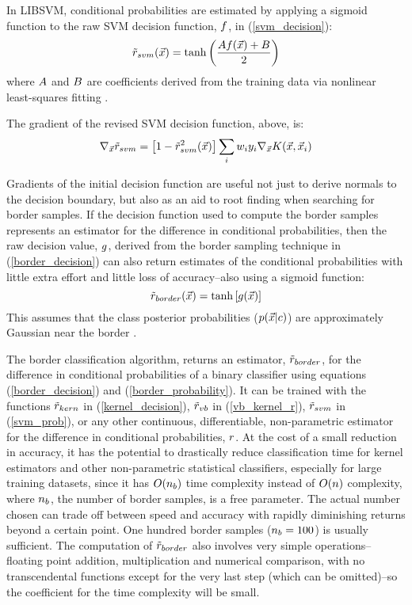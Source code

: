 \documentclass[11pt]{article}
\begin{document}
In LIBSVM, conditional probabilities are estimated by applying a
sigmoid function to
the raw SVM decision function, $f$, in (\ref{svm_decision}):
\begin{equation}
	\tilde r_{svm}(\vec {x}) = \tanh \left (\frac{A f(\vec {x})+ B}{2} \right )
	\label{svm_prob}
\end{equation}
where $A$ and $B$ are coefficients derived from
the training data via
nonlinear least-squares fitting \citep{Lin_etal2007, Chang_Lin2011}.

The gradient of the revised SVM decision function, above, is:
\begin{equation}
	\nabla_{\vec {x}} {\tilde r_{svm}} = \left [1 - \tilde r_{svm}^2(\vec {x}) \right ] \sum_i w_i y_i \nabla_{\vec {x}} K(\vec {x}, \vec {x}_i)
\end{equation}

Gradients of the initial decision function are useful not just to derive normals to
the decision boundary, but also as an aid to root finding when searching for
border samples. If the decision function used to compute the border samples
represents an estimator for the
difference in conditional probabilities, then the raw decision value,
$g$,
derived from the border sampling technique in (\ref{border_decision})
can also return estimates of the conditional probabilities with little
extra effort and little loss of accuracy--also using a sigmoid function:
\begin{equation}
	\tilde r_{border}(\vec {x}) = \tanh \left [g (\vec {x}) \right ]
	\label{border_probability}
\end{equation}
This assumes that the class posterior probabilities
($p(\vec {x} | c)$) are approximately Gaussian near the border
\citep{Mills2011}.

The border classification algorithm, returns an estimator,
$\tilde r_{border}$, for the difference in conditional probabilities of
a binary classifier using
equations (\ref{border_decision}) and (\ref{border_probability}).
It can be trained with the functions $\tilde r_{kern}$ in (\ref{kernel_decision}),
$\tilde r_{vb}$ in (\ref{vb_kernel_r}), $\tilde r_{svm}$ in (\ref{svm_prob}),
or any other 
continuous, differentiable, non-parametric estimator for the difference
in conditional probabilities, $r$.
At the cost of a small reduction in accuracy,
it has the potential to drastically reduce classification time for kernel
estimators and other non-parametric statistical classifiers,
especially for large training datasets,
since it has $O(n_b)$ time complexity instead of $O(n)$
complexity, where $n_b$, the number of border samples, is a free parameter.
The actual number chosen
can trade off between speed and accuracy with rapidly diminishing returns
beyond a certain point. 
One hundred border samples ($n_b=100$) is usually sufficient.
The computation of $\tilde r_{border}$ also involves very simple operations--
floating point addition, multiplication and numerical comparison, with no
transcendental functions except for the very last step (which can be omitted)--so the coefficient for the time complexity will be small.
\end{document}
